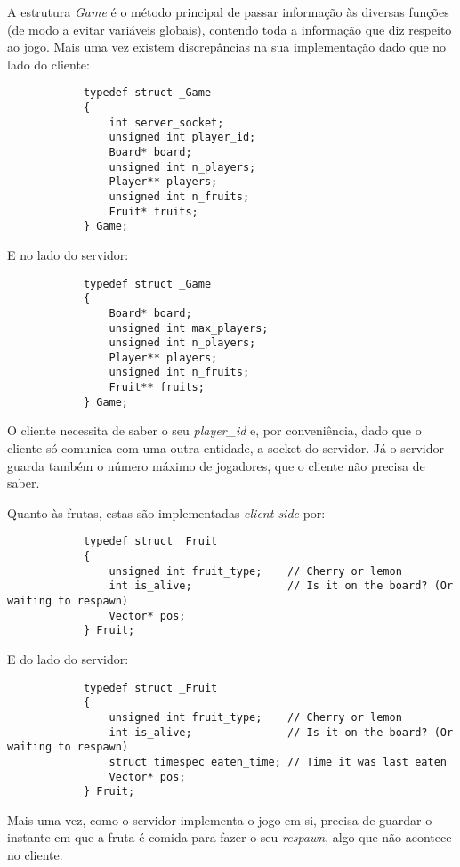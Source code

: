 \documentclass[a4paper]{report}
\begin{document}
        \par A estrutura \textit{Game} é o método principal de passar informação às diversas funções (de modo a evitar variáveis globais), contendo toda a informação que diz respeito ao jogo. Mais uma vez existem discrepâncias na sua implementação dado que no lado do cliente:
        \begin{lstlisting}
            typedef struct _Game
            {
                int server_socket;
                unsigned int player_id;
                Board* board;
                unsigned int n_players;
                Player** players;
                unsigned int n_fruits;
                Fruit* fruits;
            } Game;
        \end{lstlisting}
        \par E no lado do servidor:
        \begin{lstlisting}
            typedef struct _Game
            {
                Board* board;
                unsigned int max_players;
                unsigned int n_players;
                Player** players;
                unsigned int n_fruits;
                Fruit** fruits;
            } Game;
        \end{lstlisting}
        \par O cliente necessita de saber o seu \textit{player\_id} e, por conveniência, dado que o cliente só comunica com uma outra entidade, a socket do servidor. Já o servidor guarda também o número máximo de jogadores, que o cliente não precisa de saber.

        \par Quanto às frutas, estas são implementadas \textit{client-side} por:
        \begin{lstlisting}
            typedef struct _Fruit
            {
                unsigned int fruit_type;    // Cherry or lemon
                int is_alive;               // Is it on the board? (Or waiting to respawn)
                Vector* pos;
            } Fruit;
        \end{lstlisting}
        \par E do lado do servidor:
        \begin{lstlisting}
            typedef struct _Fruit
            {
                unsigned int fruit_type;    // Cherry or lemon
                int is_alive;               // Is it on the board? (Or waiting to respawn)
                struct timespec eaten_time; // Time it was last eaten
                Vector* pos;
            } Fruit;
        \end{lstlisting}
        \par Mais uma vez, como o servidor implementa o jogo em si, precisa de guardar o instante em que a fruta é comida para fazer o seu \textit{respawn}, algo que não acontece no cliente.
\end{document}
